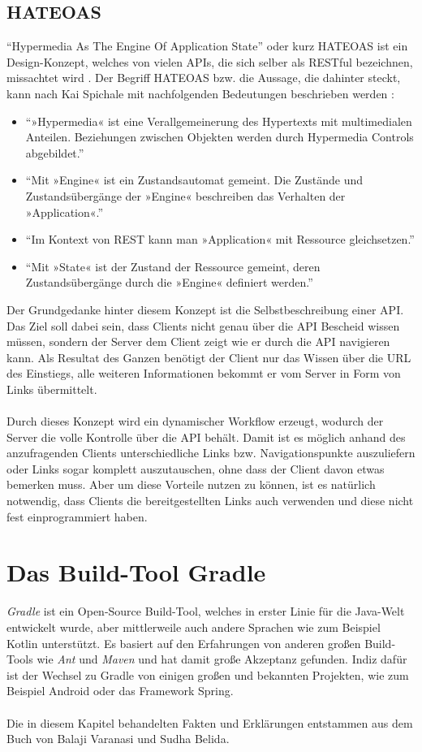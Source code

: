 \subsection{HATEOAS}
\enquote{Hypermedia As The Engine Of Application State} oder kurz HATEOAS ist ein Design-Konzept, welches von vielen \glspl{API}, die sich selber als \gls{REST}ful bezeichnen, missachtet wird \cite{restMustBeHypertextDriven}. Der Begriff HATEOAS bzw. die Aussage, die dahinter steckt, kann nach Kai Spichale mit nachfolgenden Bedeutungen beschrieben werden \cite[156]{apiDesign}:
\begin{itemize}
	\item \enquote{»Hypermedia« ist eine Verallgemeinerung des Hypertexts mit multimedialen Anteilen. Beziehungen zwischen Objekten werden durch
		Hypermedia Controls abgebildet.}
	\item \enquote{Mit »Engine« ist ein Zustandsautomat gemeint. Die Zustände und
		Zustandsübergänge der »Engine« beschreiben das Verhalten der
		»Application«.}
	\item \enquote{Im Kontext von REST kann man »Application« mit Ressource
		gleichsetzen.}
	\item \enquote{Mit »State« ist der Zustand der Ressource gemeint, deren Zustandsübergänge durch die »Engine« definiert werden.}
\end{itemize}
Der Grundgedanke hinter diesem Konzept ist die Selbstbeschreibung einer \gls{API}. Das Ziel soll dabei sein, dass Clients nicht genau über die \gls{API} Bescheid wissen müssen, sondern der Server dem Client zeigt wie er durch die \gls{API} navigieren kann. Als Resultat des Ganzen benötigt der Client nur das Wissen über die \gls{URL} des Einstiegs, alle weiteren Informationen bekommt er vom Server in Form von Links übermittelt.\\
\\
Durch dieses Konzept wird ein dynamischer Workflow erzeugt, wodurch der Server die volle Kontrolle über die \gls{API} behält. Damit ist es möglich anhand des anzufragenden Clients unterschiedliche Links bzw. Navigationspunkte auszuliefern oder Links sogar komplett auszutauschen, ohne dass der Client davon etwas bemerken muss. Aber um diese Vorteile nutzen zu können, ist es natürlich notwendig, dass Clients die bereitgestellten Links auch verwenden und diese nicht fest einprogrammiert haben.

\section{Das Build-Tool Gradle}
\textit{Gradle} ist ein Open-Source Build-Tool, welches in erster Linie für die Java-Welt entwickelt wurde, aber mittlerweile auch andere Sprachen wie zum Beispiel Kotlin unterstützt. Es basiert auf den Erfahrungen von anderen großen Build-Tools wie \textit{Ant} und \textit{Maven} und hat damit große Akzeptanz gefunden. Indiz dafür ist der Wechsel zu Gradle von einigen großen und bekannten Projekten, wie zum Beispiel Android oder das Framework Spring.\\
\\
Die in diesem Kapitel behandelten Fakten und Erklärungen entstammen aus dem Buch \cite{introducingGradle} von Balaji Varanasi und Sudha Belida.

